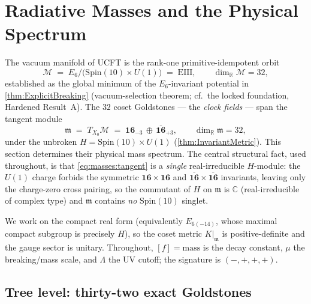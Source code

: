 \section{Radiative Masses and the Physical Spectrum}
\label{sec:masses:main}

The vacuum manifold of UCFT is the rank-one primitive-idempotent orbit
\[
  \mathcal{M} \;=\; E_{6}/\bigl(\mathrm{Spin}(10)\times U(1)\bigr) \;=\; \mathrm{EIII},
  \qquad \dim_{\mathbb R}\mathcal{M} = 32,
\]
established as the global minimum of the $E_{6}$-invariant potential in
\autoref{thm:ExplicitBreaking} (vacuum-selection theorem; cf.\ the locked
foundation, Hardened Result~A). The $32$ coset Goldstones --- the
\emph{clock fields} --- span the tangent module
\begin{equation}\label{eq:masses:tangent}
  \mathfrak m \;=\; T_{X_{0}}\mathcal{M}
  \;=\; \mathbf{16}_{-3}\,\oplus\,\overline{\mathbf{16}}_{+3},
  \qquad \dim_{\mathbb R}\mathfrak m = 32,
\end{equation}
under the unbroken $H=\mathrm{Spin}(10)\times U(1)$ (\autoref{thm:InvariantMetric}).
This section determines their physical mass spectrum. The central structural
fact, used throughout, is that \eqref{eq:masses:tangent} is a \emph{single}
real-irreducible $H$-module: the $U(1)$ charge forbids the symmetric
$\mathbf{16}\times\mathbf{16}$ and $\overline{\mathbf{16}}\times\overline{\mathbf{16}}$
invariants, leaving only the charge-zero cross pairing, so the commutant of
$H$ on $\mathfrak m$ is $\mathbb C$ (real-irreducible of complex type) and
$\mathfrak m$ contains \emph{no} $\mathrm{Spin}(10)$ singlet.

We work on the compact real form (equivalently $E_{6(-14)}$, whose maximal
compact subgroup is precisely $H$), so the coset metric $K|_{\mathfrak m}$ is
positive-definite and the gauge sector is unitary. Throughout, $[f]=\text{mass}$
is the decay constant, $\mu$ the breaking/mass scale, and $\Lambda$ the UV
cutoff; the signature is $(-,+,+,+)$.

\subsection{Tree level: thirty-two exact Goldstones}
\label{sec:masses:tree}

